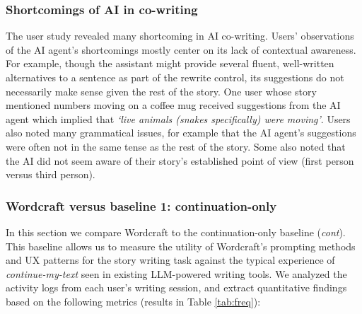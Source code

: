 \subsubsection{Shortcomings of AI in co-writing}

The user study revealed many shortcoming in AI co-writing.
Users' observations of the AI agent's shortcomings mostly center on its lack of contextual awareness. 
For example, though the assistant might provide several fluent, well-written alternatives to a sentence as part of the rewrite control, its suggestions do not necessarily make sense given the rest of the story. One user whose story mentioned numbers moving on a coffee mug received suggestions from the AI agent which implied that \textit{`live animals (snakes specifically) were moving'}.
Users also noted many grammatical issues, for example that the AI agent's suggestions were often not in the same tense as the rest of the story. Some also noted that the AI did not seem aware of their story's established point of view (first person versus third person). 




\subsubsection{Wordcraft versus baseline 1: continuation-only}
In this section we compare Wordcraft to the continuation-only baseline (\textit{cont}). 
This baseline allows us to measure the utility of Wordcraft's prompting methods and UX patterns for the story writing task against the typical experience of \textit{continue-my-text} seen in existing LLM-powered writing tools.
We analyzed the activity logs from each user's writing session, and extract quantitative findings based on the following metrics (results in Table \ref{tab:freq}):

